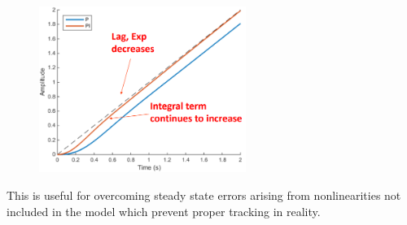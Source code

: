\documentclass[class=report, crop=false, 12pt,a4paper]{standalone}
\begin{document}
\begin{figure}[H]
  \centerline{\includegraphics[width = 0.6\textwidth]{../img/diagram130.png}}
  \caption{}
\end{figure}
This is useful for overcoming steady state errors arising from nonlinearities not included in the model which prevent proper tracking in reality.
\end{document}
